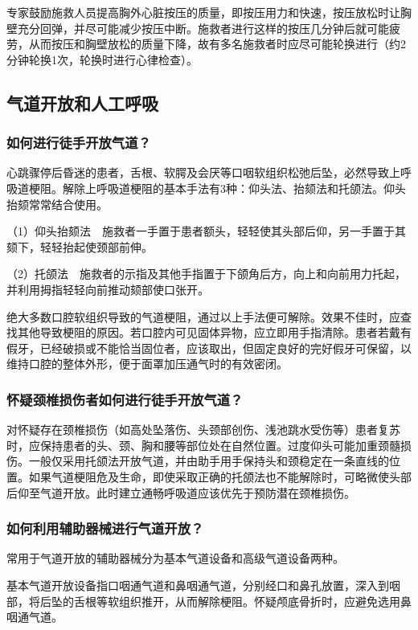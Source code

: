 专家鼓励施救人员提高胸外心脏按压的质量，即按压用力和快速，按压放松时让胸壁充分回弹，并尽可能减少按压中断。施救者进行这样的按压几分钟后就可能疲劳，从而按压和胸壁放松的质量下降，故有多名施救者时应尽可能轮换进行（约2分钟轮换1次，轮换时进行心律检查）。

\subsection{气道开放和人工呼吸}

\subsubsection{如何进行徒手开放气道？}

心跳骤停后昏迷的患者，舌根、软腭及会厌等口咽软组织松弛后坠，必然导致上呼吸道梗阻。解除上呼吸道梗阻的基本手法有3种：仰头法、抬颏法和托颌法。仰头抬颏常常结合使用。

（1）仰头抬颏法　施救者一手置于患者额头，轻轻使其头部后仰，另一手置于其颏下，轻轻抬起使颈部前伸。

（2）托颌法　施救者的示指及其他手指置于下颌角后方，向上和向前用力托起，并利用拇指轻轻向前推动颏部使口张开。

绝大多数口腔软组织导致的气道梗阻，通过以上手法便可解除。效果不佳时，应查找其他导致梗阻的原因。若口腔内可见固体异物，应立即用手指清除。患者若戴有假牙，已经破损或不能恰当固位者，应该取出，但固定良好的完好假牙可保留，以维持口腔的整体外形，便于面罩加压通气时的有效密闭。

\subsubsection{怀疑颈椎损伤者如何进行徒手开放气道？}

对怀疑存在颈椎损伤（如高处坠落伤、头颈部创伤、浅池跳水受伤等）患者复苏时，应保持患者的头、颈、胸和腰等部位处在自然位置。过度仰头可能加重颈髓损伤。一般仅采用托颌法开放气道，并由助手用手保持头和颈稳定在一条直线的位置。如果气道梗阻危及生命，即使采取正确的托颌法也不能解除时，可略微使头部后仰至气道开放。此时建立通畅呼吸道应该优先于预防潜在颈椎损伤。

\subsubsection{如何利用辅助器械进行气道开放？}

常用于气道开放的辅助器械分为基本气道设备和高级气道设备两种。

基本气道开放设备指口咽通气道和鼻咽通气道，分别经口和鼻孔放置，深入到咽部，将后坠的舌根等软组织推开，从而解除梗阻。怀疑颅底骨折时，应避免选用鼻咽通气道。

